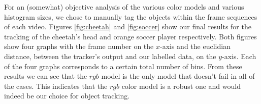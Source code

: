 \documentclass[11pt]{article}
\begin{document}
For an (somewhat) objective analysis of the various color models and various
histogram sizes, we chose to manually tag the objects within the frame
sequences of each video. Figures \ref{fig:cheetah} and \ref{fig:soccer} show
our final results for the tracking of the cheetah's head and orange soccer
player respectively.  
Both figures show four graphs with the frame number on the $x$-axis and the
euclidian distance, between the tracker's output and our labelled data, on the
$y$-axis. Each of the four graphs corresponds to a certain total number of
bins. From these results we can see that the $rgb$ model is the only model that
doesn't fail in all of the cases. This indicates that the $rgb$ color model is a
robust one and would indeed be our choice for object tracking.
\begin{figure}[!ht]
\centering
{}
\\
\end{figure}
\end{document}
